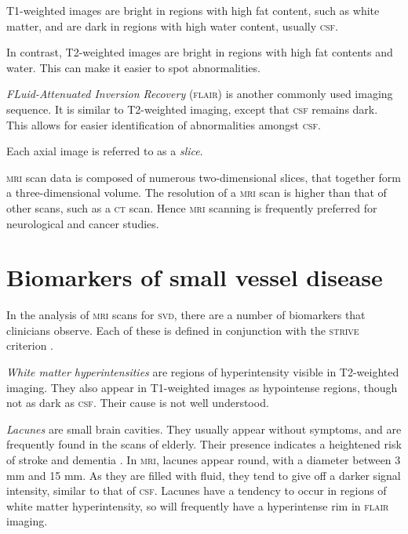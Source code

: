 T1-weighted images are bright in regions with high fat content, such as white matter, and are dark in regions with high water content, usually \textsc{csf}.

In contrast, T2-weighted images are bright in regions with high fat contents and water. This can make it easier to spot abnormalities.

\textit{FLuid-Attenuated Inversion Recovery} (\textsc{flair}) is another commonly used imaging sequence. It is similar to T2-weighted imaging, except that \textsc{csf} remains dark. This allows for easier identification of abnormalities amongst \textsc{csf}.

Each axial image is referred to as a \textit{slice}.


\textsc{mri} scan data is composed of numerous two-dimensional slices, that together form a three-dimensional volume. The resolution of a \textsc{mri} scan is higher than that of other scans, such as a \textsc{ct} scan. Hence \textsc{mri} scanning is frequently preferred for neurological and cancer studies.

\section{Biomarkers of small vessel disease}\label{svd-markers}

In the analysis of \textsc{mri} scans for \textsc{svd}, there are a number of biomarkers that clinicians observe. Each of these is defined in conjunction with the \textsc{strive} criterion \cite{WardlawJ.M.2013Nsfr}.

\textit{White matter hyperintensities} are regions of hyperintensity visible in T2-weighted imaging. They also appear in T1-weighted images as hypointense regions, though not as dark as \textsc{csf}. Their cause is not well understood.

\textit{Lacunes} are small brain cavities. They usually appear without symptoms, and are frequently found in the scans of elderly. Their presence indicates a heightened risk of stroke and dementia \cite{BenjaminJ.Philip2018LIbN,VanDerFlierM.Wiesje2005SVDa}. In \textsc{mri}, lacunes appear round, with a diameter between 3 mm and 15 mm. As they are filled with fluid, they tend to give off a darker signal intensity, similar to that of \textsc{csf}. Lacunes have a tendency to occur in regions of white matter hyperintensity, so will frequently have a hyperintense rim in \textsc{flair} imaging.

